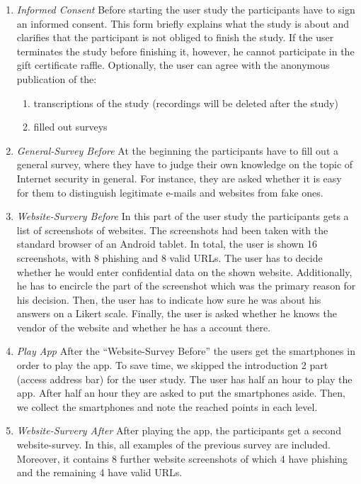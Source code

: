 \begin{enumerate}
	\item \textit{Informed Consent} Before starting the user study the participants have to sign an informed consent.
This form briefly explains what the study is about and clarifies that the participant is not obliged to finish the study.
If the user terminates the study before finishing it, however, he cannot participate in the gift certificate raffle.
Optionally, the user can agree with the anonymous publication of the:
	\begin{enumerate}
		\item transcriptions of the study (recordings will be deleted after the study)
		\item filled out surveys
	\end{enumerate}

	\item \textit{General-Survey Before} At the beginning the participants have to fill out a general survey, where they have to judge their own knowledge on the topic of Internet security in general.
 For instance, they are asked whether it is easy for them to distinguish legitimate e-mails and websites from fake ones.

	\item \textit{Website-Survery Before} In this part of the user study the participants gets a list of screenshots of websites.
 The screenshots had been taken with the standard browser of an Android tablet.
 In total, the user is shown 16 screenshots, with 8 phishing and 8 valid URLs.
 The user has to decide whether he would enter confidential data on the shown website.
 Additionally, he has to encircle the part of the screenshot which was the primary reason for his decision.
 Then, the user has to indicate how sure he was about his answers on a Likert scale.
 Finally, the user is asked whether he knows the vendor of the website and whether he has a account there.

	\item \textit{Play App} After the ``Website-Survey Before'' the users get the smartphones in order to play the app.
 To save time, we skipped the introduction 2 part (access address bar) for the user study.
 The user has half an hour to play the app.
 After half an hour they are asked to put the smartphones aside.
 Then, we collect the smartphones and note the reached points in each level.

	\item \textit{Website-Survery After} After playing the app, the participants get a second website-survey.
 In this, all examples of the previous survey are included.
 Moreover, it contains 8 further website screenshots of which 4 have phishing and the remaining 4 have valid URLs.


\end{enumerate}
